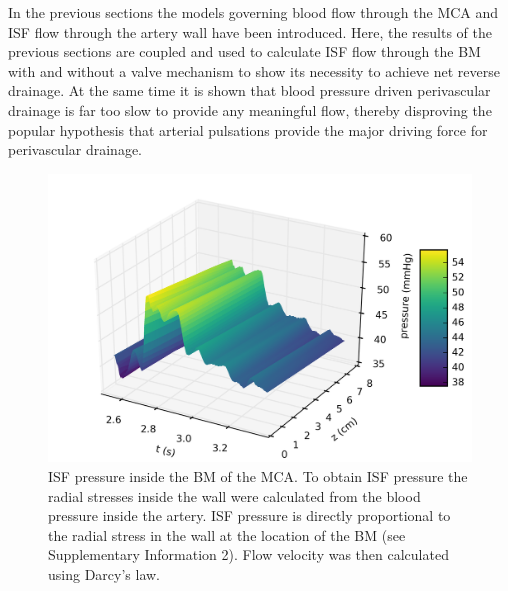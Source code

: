 \documentclass[a4paper,titlepage]{scrartcl}
\begin{document}
In the previous sections the models governing blood flow through the MCA and ISF flow through the artery wall have been introduced. Here, the results of the previous sections are coupled and used to calculate ISF flow through the BM with and without a valve mechanism to show its necessity to achieve net reverse drainage. At the same time it is shown that blood pressure driven perivascular drainage is far too slow to provide any meaningful flow, thereby disproving the popular hypothesis that arterial pulsations provide the major driving force for perivascular drainage.

\begin{figure}
\centerline{\includegraphics{figures/bm_pressure.png}}
\caption{ISF pressure inside the BM of the MCA. To obtain ISF pressure the radial stresses inside the wall were calculated from the blood pressure inside the artery. ISF pressure is directly proportional to the radial stress in the wall at the location of the BM (see Supplementary Information 2). Flow velocity was then calculated using Darcy's law.\label{fig:bm_pressure}}
\end{figure}
\end{document}
